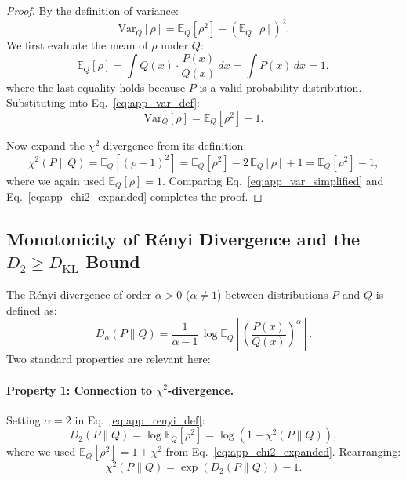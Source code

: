 \documentclass[runningheads]{llncs}
\begin{document}
\begin{proof}
By the definition of variance:
\begin{equation}
    \mathrm{Var}_{Q}[\rho]
    = \mathbb{E}_{Q}[\rho^2] - \left(\mathbb{E}_{Q}[\rho]\right)^2.
    \label{eq:app_var_def}
\end{equation}
We first evaluate the mean of $\rho$ under $Q$:
\begin{equation}
    \mathbb{E}_{Q}[\rho]
    = \int Q(x) \cdot \frac{P(x)}{Q(x)} \, dx
    = \int P(x) \, dx
    = 1,
    \label{eq:app_rho_mean}
\end{equation}
where the last equality holds because $P$ is a valid probability distribution. Substituting into Eq.~\eqref{eq:app_var_def}:
\begin{equation}
    \mathrm{Var}_{Q}[\rho]
    = \mathbb{E}_{Q}[\rho^2] - 1.
    \label{eq:app_var_simplified}
\end{equation}

Now expand the $\chi^2$-divergence from its definition:
\begin{equation}
    \chi^2(P \| Q)
    = \mathbb{E}_{Q}\!\left[(\rho - 1)^2\right]
    = \mathbb{E}_{Q}[\rho^2] - 2\,\mathbb{E}_{Q}[\rho] + 1
    = \mathbb{E}_{Q}[\rho^2] - 1,
    \label{eq:app_chi2_expanded}
\end{equation}
where we again used $\mathbb{E}_Q[\rho] = 1$. Comparing Eq.~\eqref{eq:app_var_simplified} and Eq.~\eqref{eq:app_chi2_expanded} completes the proof.
\end{proof}

\subsection{Monotonicity of R\'{e}nyi Divergence and the \texorpdfstring{$D_2 \geq D_{\mathrm{KL}}$}{D2 >= DKL} Bound}
\label{app:renyi_mono}

The R\'{e}nyi divergence of order $\alpha > 0$ ($\alpha \neq 1$) between distributions $P$ and $Q$ is defined as:
\begin{equation}
    D_\alpha(P \| Q)
    = \frac{1}{\alpha - 1}\,\log \mathbb{E}_{Q}\!\left[\left(\frac{P(x)}{Q(x)}\right)^{\!\alpha}\right].
    \label{eq:app_renyi_def}
\end{equation}
Two standard properties are relevant here:

\paragraph{Property 1: Connection to $\chi^2$-divergence.}
Setting $\alpha = 2$ in Eq.~\eqref{eq:app_renyi_def}:
\begin{equation}
    D_2(P \| Q)
    = \log \mathbb{E}_{Q}\!\left[\rho^2\right]
    = \log\!\left(1 + \chi^2(P \| Q)\right),
    \label{eq:app_d2_chi2}
\end{equation}
where we used $\mathbb{E}_Q[\rho^2] = 1 + \chi^2$ from Eq.~\eqref{eq:app_chi2_expanded}. Rearranging:
\begin{equation}
    \chi^2(P \| Q) = \exp\!\left(D_2(P \| Q)\right) - 1.
    \label{eq:app_chi2_from_d2}
\end{equation}
\end{document}
